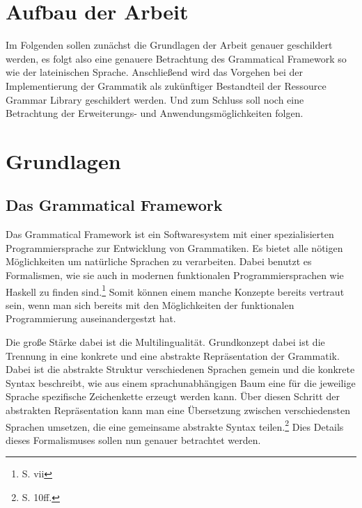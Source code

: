 \documentclass[12pt,abstract=on]{scrreprt}
\begin{document}
\section{Aufbau der Arbeit}
Im Folgenden sollen zunächst die Grundlagen der Arbeit genauer geschildert werden, es folgt also eine genauere Betrachtung des Grammatical Framework so wie der lateinischen Sprache. Anschließend wird das Vorgehen bei der Implementierung der Grammatik als zukünftiger Bestandteil der Ressource Grammar Library geschildert werden. Und zum Schluss soll noch eine Betrachtung der Erweiterungs- und Anwendungsmöglichkeiten folgen.
\pagebreak
\section{Grundlagen}
\subsection{Das Grammatical Framework}
Das Grammatical Framework ist ein Softwaresystem mit einer spezialisierten Programmiersprache zur Entwicklung von Grammatiken. Es bietet alle nötigen Möglichkeiten um natürliche Sprachen zu verarbeiten. Dabei benutzt es Formalismen, wie sie auch in modernen funktionalen Programmiersprachen wie Haskell zu finden sind.\footnote{\cite{RANTA2011} S. vii} Somit können einem manche Konzepte bereits vertraut sein, wenn man sich bereits mit den Möglichkeiten der funktionalen Programmierung auseinandergestzt hat.\par 
Die große Stärke dabei ist die Multilingualität. Grundkonzept dabei ist die Trennung in eine konkrete und eine abstrakte Repräsentation der Grammatik. Dabei ist die abstrakte Struktur verschiedenen Sprachen gemein und die konkrete Syntax beschreibt, wie aus einem sprachunabhängigen Baum eine für die jeweilige Sprache spezifische Zeichenkette erzeugt werden kann. Über diesen Schritt der abstrakten Repräsentation kann man eine Übersetzung zwischen verschiedensten Sprachen umsetzen, die eine gemeinsame abstrakte Syntax teilen.\footnote{\cite{RANTA2011} S. 10ff.} Dies Details dieses Formalismuses sollen nun genauer betrachtet werden.
\end{document}
